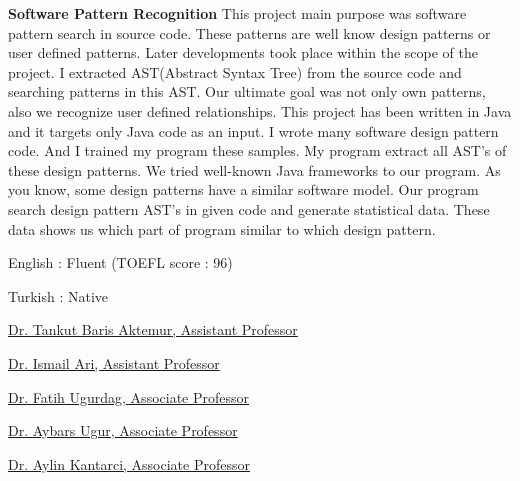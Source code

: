 \documentclass[12pt,letterpaper]{article}
\newenvironment{itemize*}%
{\begin{itemize}%
  \setlength{\itemsep}{0pt}}%
{\end{itemize}}
\newcommand{\mhead}[1]{\leavevmode\marginpar{\sffamily\footnotesize #1}}
\begin{document}
\medskip
\textbf{Software Pattern Recognition}\newline
This project main purpose was software pattern search in source code. These patterns
are well know design patterns or user defined patterns. Later developments took place
within the scope of the project. I extracted AST(Abstract Syntax Tree) from the
source code and searching patterns in this AST. Our ultimate goal was not only own
patterns, also we recognize user defined relationships. This project has been written in
Java and it targets only Java code as an input. I wrote many software design pattern
code. And I trained my program these samples. My program extract all AST’s of these
design patterns. We tried well-known Java frameworks to our program. As you know,
some design patterns have a similar software model. Our program search design
pattern AST’s in given code and generate statistical data. These data shows us which
part of program similar to which design pattern.

\bigskip
\mhead{Languages}
\begin{itemize*}
  \item English : Fluent (TOEFL score : 96)
  \item Turkish : Native
\end{itemize*}

\bigskip
\mhead{References}%
\begin{itemize*}
\item \href{http://aktemur.github.io}{Dr. Tankut Baris Aktemur, Assistant Professor}
\item \href{http://faculty.ozyegin.edu.tr/ismailari}{Dr. Ismail Ari, Assistant Professor}
\item \href{http://ugurdag.com}{Dr. Fatih Ugurdag, Associate Professor}
\item \href{http://yzgrafik.ege.edu.tr/~ugur}{Dr. Aybars Ugur, Associate Professor}
\item \href{http://efe.ege.edu.tr/~kantarci}{Dr. Aylin Kantarci, Associate Professor}
\end{itemize*}
\end{document}

